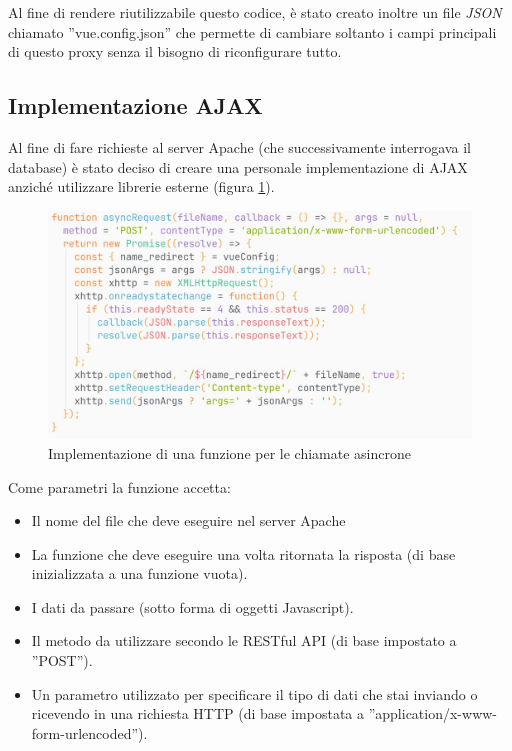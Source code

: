 Al fine di rendere riutilizzabile questo codice, è stato creato inoltre un file \emph{JSON} chiamato ”vue.config.json” che permette di cambiare soltanto i campi principali di questo proxy senza il bisogno di riconfigurare tutto.

\subsection{Implementazione AJAX}
Al fine di fare richieste al server Apache (che successivamente interrogava il database) è stato deciso di creare una personale implementazione di AJAX anziché utilizzare librerie esterne (figura \ref{fig:ajax}).

\begin{figure}[h]
\begin{center}                      
\includegraphics[width=13cm]{images/AJAX.jpg}
\caption[Implementazione di una funzione per le chiamate asincrone]{Implementazione di una funzione per le chiamate asincrone}\label{fig:ajax}
\end{center}
\end{figure}

Come parametri la funzione accetta:
\begin{itemize}
    \item Il nome del file che deve eseguire nel server Apache
    \item La funzione che deve eseguire una volta ritornata la risposta (di base inizializzata a una funzione vuota).
    \item I dati da passare (sotto forma di oggetti Javascript).
    \item Il metodo da utilizzare secondo le RESTful API (di base impostato a ”POST”).
    \item  Un parametro utilizzato per specificare il tipo di dati che stai inviando o ricevendo in una richiesta HTTP (di base impostata a ”application/x-www-form-urlencoded”). 
\end{itemize}

